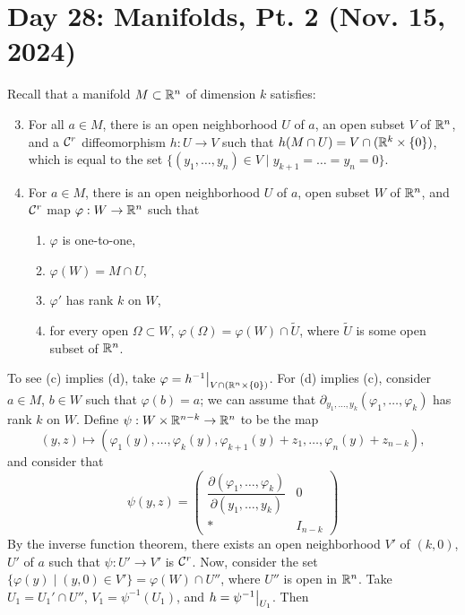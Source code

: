 \section{Day 28: Manifolds, Pt. 2 (Nov. 15, 2024)}
Recall that a manifold $M \subset \mathbb R^n$ of dimension $k$ satisfies:
\begin{enumerate}[label=(\alph*)]
    \setcounter{enumi}{2}
    \item For all $a \in M$, there is an open neighborhood $U$ of $a$, an open subset $V$ of $\mathbb R^n$, and a $\mathcal C^r$ diffeomorphism $h : U \to V$ such that $h(M \cap U) = V \cap (\mathbb R^k \times \{0\})$, which is equal to the set $\{(y_1, \dots, y_n) \in V \mid y_{k+1} = \dots = y_n = 0 \}$.
    \item For $a \in M$, there is an open neighborhood $U$ of $a$, open subset $W$ of $\mathbb R^n$, and $\mathcal C^r$ map $\varphi : W \to \mathbb R^n$ such that
        \begin{enumerate}[label=(\roman*)]
            \item $\varphi$ is one-to-one,
            \item $\varphi(W) = M \cap U$,
            \item $\varphi'$ has rank $k$ on $W$,
            \item for every open $\Omega \subset W$, $\varphi(\Omega) = \varphi(W) \cap \tilde{U}$, where $\tilde{U}$ is some open subset of $\mathbb R^n$.
        \end{enumerate}
\end{enumerate}
To see (c) implies (d), take $\varphi = \restr{h^{-1}}{V \cap (\RR^n \times \{0\})}$. For (d) implies (c), consider $a \in M$, $b \in W$ such that $\varphi(b) = a$; we can assume that $\partial_{y_1, \dots, y_k} (\varphi_1, \dots, \varphi_k)$ has rank $k$ on $W$. Define $\psi : W \times \mathbb R^{n-k}\to \mathbb R^n$ to be the map
\[ (y, z) \mapsto (\varphi_1(y), \dots, \varphi_k(y), \varphi_{k+1}(y) + z_1, \dots, \varphi_{n}(y) + z_{n-k}), \]
and consider that
\[ \psi(y, z) = \left(\begin{array}{c|c} \dfrac{\partial (\varphi_1, \dots, \varphi_k)}{\partial (y_1, \dots, y_k)} & 0 \\ \hline \ast & I_{n-k} \end{array}\right) \]
By the inverse function theorem, there exists an open neighborhood $V'$ of $(k, 0)$, $U'$ of $a$ such that $\psi : U' \to V'$ is $\mathcal C^r$.
\medskip\newline
Now, consider the set $\{\varphi(y) \mid (y, 0) \in V'\} = \varphi(W) \cap U''$, where $U''$ is open in $\mathbb R^n$. Take $U_1 = U_1' \cap U''$, $V_1 = \psi^{-1}(U_1)$, and $h = \restr{\psi^{-1}}{U_1}$. Then
